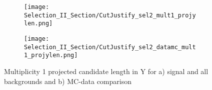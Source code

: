 \documentclass{article}
\begin{document}
\begin{figure}[h!]
\centering
  \begin{subfigure}[t]{0.4\textwidth}
    \centering
\texttt{[image: Selection\_II\_Section/CutJustify\_sel2\_mult1\_projylen.png]}
    \caption{ }
  \end{subfigure} 
  \hspace{20mm}
  \begin{subfigure}[t]{0.4\textwidth}
    \centering
\texttt{[image: Selection\_II\_Section/CutJustify\_sel2\_datamc\_mult1\_projylen.png]}
   \caption{ }
  \end{subfigure} 
\caption{Multiplicity 1 projected candidate length in Y for a) signal and all backgrounds and b) MC-data comparison }
\label{fig:cutjust_sel2_mult1_projylen}
\end{figure}
\end{document}
